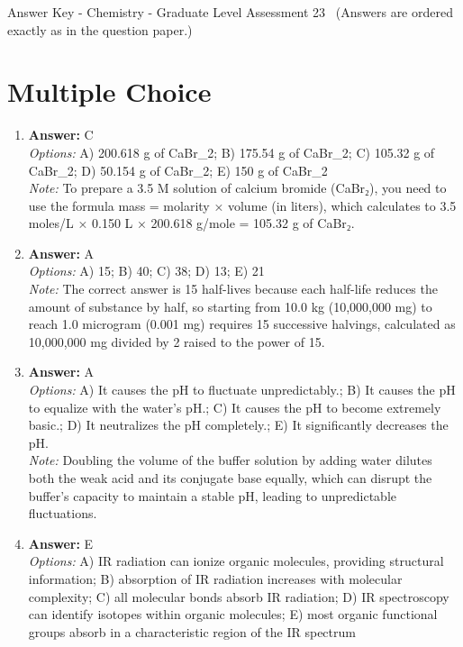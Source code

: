 \documentclass[12pt]{article}
\begin{document}
\begin{center}
Answer Key - Chemistry - Graduate Level Assessment 23 \
\small (Answers are ordered exactly as in the question paper.)
\end{center}

\section*{Multiple Choice}
\begin{enumerate}[label=\arabic*.]
\item \textbf{Answer:} C
\\ \textit{Options:} A) 200.618 g of CaBr\_2; B) 175.54 g of CaBr\_2; C) 105.32 g of CaBr\_2; D) 50.154 g of CaBr\_2; E) 150 g of CaBr\_2
\\ \textit{Note:} To prepare a 3.5 M solution of calcium bromide (CaBr₂), you need to use the formula mass = molarity × volume (in liters), which calculates to 3.5 moles/L × 0.150 L × 200.618 g/mole = 105.32 g of CaBr₂.
\item \textbf{Answer:} A
\\ \textit{Options:} A) 15; B) 40; C) 38; D) 13; E) 21
\\ \textit{Note:} The correct answer is 15 half-lives because each half-life reduces the amount of substance by half, so starting from 10.0 kg (10,000,000 mg) to reach 1.0 microgram (0.001 mg) requires 15 successive halvings, calculated as 10,000,000 mg divided by 2 raised to the power of 15.
\item \textbf{Answer:} A
\\ \textit{Options:} A) It causes the pH to fluctuate unpredictably.; B) It causes the pH to equalize with the water's pH.; C) It causes the pH to become extremely basic.; D) It neutralizes the pH completely.; E) It significantly decreases the pH.
\\ \textit{Note:} Doubling the volume of the buffer solution by adding water dilutes both the weak acid and its conjugate base equally, which can disrupt the buffer's capacity to maintain a stable pH, leading to unpredictable fluctuations.
\item \textbf{Answer:} E
\\ \textit{Options:} A) IR radiation can ionize organic molecules, providing structural information; B) absorption of IR radiation increases with molecular complexity; C) all molecular bonds absorb IR radiation; D) IR spectroscopy can identify isotopes within organic molecules; E) most organic functional groups absorb in a characteristic region of the IR spectrum

\end{enumerate}
\end{document}
